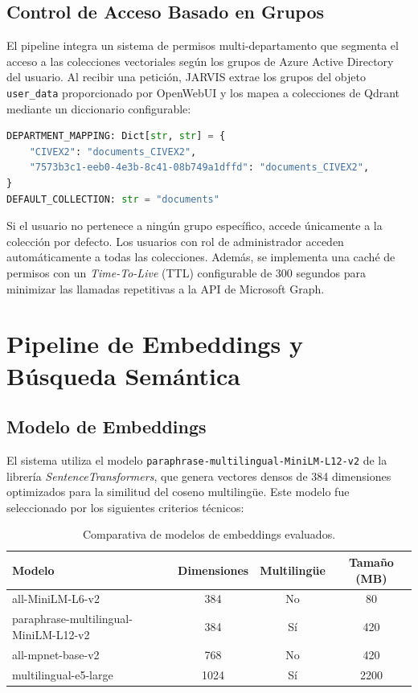 \subsection{Control de Acceso Basado en Grupos}
El pipeline integra un sistema de permisos multi-departamento que segmenta el acceso a las colecciones vectoriales según los grupos de Azure Active Directory del usuario. Al recibir una petición, JARVIS extrae los grupos del objeto \texttt{user\_data} proporcionado por OpenWebUI y los mapea a colecciones de Qdrant mediante un diccionario configurable:

\begin{lstlisting}[language=Python, caption={Configuración del mapeo departamental en JARVIS.}]
DEPARTMENT_MAPPING: Dict[str, str] = {
    "CIVEX2": "documents_CIVEX2",
    "7573b3c1-eeb0-4e3b-8c41-08b749a1dffd": "documents_CIVEX2",
}
DEFAULT_COLLECTION: str = "documents"
\end{lstlisting}

Si el usuario no pertenece a ningún grupo específico, accede únicamente a la colección por defecto. Los usuarios con rol de administrador acceden automáticamente a todas las colecciones. Además, se implementa una caché de permisos con un \textit{Time-To-Live} (TTL) configurable de 300 segundos para minimizar las llamadas repetitivas a la API de Microsoft Graph.

\section{Pipeline de Embeddings y Búsqueda Semántica}

\subsection{Modelo de Embeddings}
El sistema utiliza el modelo \texttt{paraphrase-multilingual-MiniLM-L12-v2} de la librería \textit{SentenceTransformers}, que genera vectores densos de 384 dimensiones optimizados para la similitud del coseno multilingüe. Este modelo fue seleccionado por los siguientes criterios técnicos:

\begin{table}[H]
\centering
\caption{Comparativa de modelos de embeddings evaluados.}
\label{tab:embeddings-comparativa}
\begin{tabular}{lccc}
\toprule
\textbf{Modelo} & \textbf{Dimensiones} & \textbf{Multilingüe} & \textbf{Tamaño (MB)} \\
\midrule
all-MiniLM-L6-v2           & 384  & No  & 80  \\
paraphrase-multilingual-MiniLM-L12-v2 & 384 & Sí & 420 \\
all-mpnet-base-v2          & 768  & No  & 420 \\
multilingual-e5-large      & 1024 & Sí  & 2200 \\
\bottomrule
\end{tabular}
\end{table}

